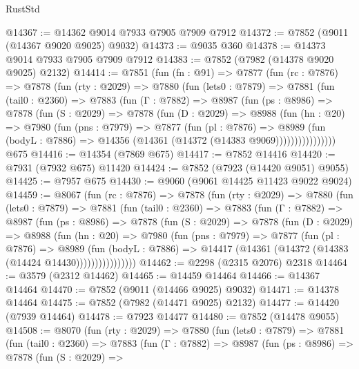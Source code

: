 \begin{lexlean}{RustStd}
\begin{coremodule}
@14367 := @14362 @9014 @7933 @7905 @7909 @7912
@14372 := @7852 (@9011 (@14367 @9020 @9025) @9032)
@14373 := @9035 @360
@14378 := @14373 @9014 @7933 @7905 @7909 @7912
@14383 := @7852 (@7982 (@14378 @9020 @9025) @2132)
@14414 := @7851
    (fun (fn : @91) =>
    @7877
      (fun (rc : @7876) =>
      @7878
        (fun (rty : @2029) =>
        @7880
          (fun (lets0 : @7879) =>
          @7881
            (fun (tail0 : @2360) =>
            @7883
              (fun (Γ : @7882) =>
              @8987
                (fun (ps : @8986) =>
                @7878
                  (fun (S : @2029) =>
                  @7878
                    (fun (D : @2029) =>
                    @8988
                      (fun (hn : @20) =>
                      @7980
                        (fun (pns : @7979) =>
                        @7877
                          (fun (pl : @7876) =>
                          @8989
                            (fun (bodyL : @7886) =>
                            @14356 (@14361 (@14372 (@14383 @9069))))))))))))))))
    @675
@14416 := @14354 (@7869 @675)
@14417 := @7852 @14416
@14420 := @7931 (@7932 @675) @11420
@14424 := @7852 (@7923 (@14420 @9051) @9055)
@14425 := @7957 @675
@14430 := @9060 (@9061 @14425 @11423 @9022 @9024)
@14459 := @8067
    (fun (rc : @7876) =>
    @7878
      (fun (rty : @2029) =>
      @7880
        (fun (lets0 : @7879) =>
        @7881
          (fun (tail0 : @2360) =>
          @7883
            (fun (Γ : @7882) =>
            @8987
              (fun (ps : @8986) =>
              @7878
                (fun (S : @2029) =>
                @7878
                  (fun (D : @2029) =>
                  @8988
                    (fun (hn : @20) =>
                    @7980
                      (fun (pns : @7979) =>
                      @7877
                        (fun (pl : @7876) =>
                        @8989
                          (fun (bodyL : @7886) =>
                          @14417 (@14361 (@14372 (@14383 (@14424 @14430))))))))))))))))
@14462 := @2298 (@2315 @2076) @2318
@14464 := @3579 (@2312 @14462)
@14465 := @14459 @14464
@14466 := @14367 @14464
@14470 := @7852 (@9011 (@14466 @9025) @9032)
@14471 := @14378 @14464
@14475 := @7852 (@7982 (@14471 @9025) @2132)
@14477 := @14420 (@7939 @14464)
@14478 := @7923 @14477
@14480 := @7852 (@14478 @9055)
@14508 := @8070
    (fun (rty : @2029) =>
    @7880
      (fun (lets0 : @7879) =>
      @7881
        (fun (tail0 : @2360) =>
        @7883
          (fun (Γ : @7882) =>
          @8987
            (fun (ps : @8986) =>
            @7878
              (fun (S : @2029) =>

\end{coremodule}
\end{lexlean}
